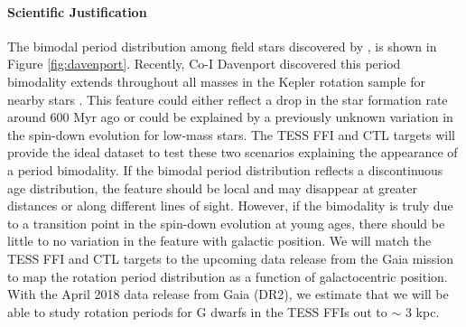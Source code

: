 \documentclass[letterpaper,12pt,preprint]{hack_aastex}
\begin{document}
\paragraph{Scientific Justification}

The bimodal period distribution among field stars discovered by
\citet{mcquillan2013}, is shown in Figure \ref{fig:davenport}.
Recently, Co-I Davenport discovered this period bimodality extends throughout
all masses in the Kepler rotation sample for nearby stars
\citep{davenport2017}.
This feature could either reflect a drop in the star formation rate around 600
Myr ago or could be explained by a previously unknown variation in the
spin-down evolution for low-mass stars.
The TESS FFI and CTL targets will provide the ideal dataset to test these two
scenarios explaining the appearance of a period bimodality.
If the bimodal period distribution reflects a discontinuous age distribution,
the feature should be local and may disappear at greater distances or along
different lines of sight.
However, if the bimodality is truly due to a transition point in the spin-down
evolution at young ages, there should be little to no variation in the feature
with galactic position.
We will match the TESS FFI and CTL targets to the upcoming data
release from the Gaia mission \citep{perryman2001} to map the rotation period
distribution as a function of galactocentric position.
With the April 2018 data release from Gaia (DR2), we estimate that we will be
able to study rotation periods for G dwarfs in the TESS FFIs out to $\sim$ 3
kpc.


\end{document}
